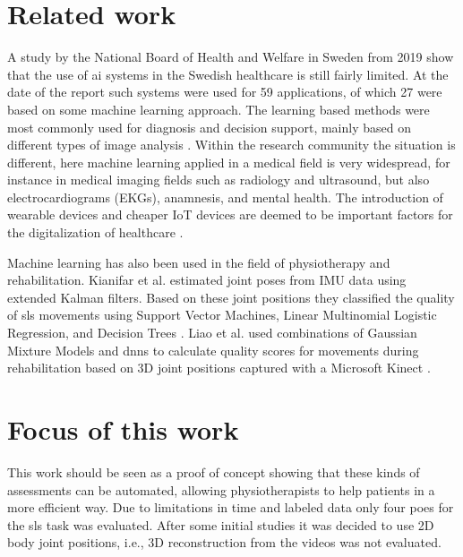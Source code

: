 \section{Related work}
A study by the National Board of Health and Welfare in Sweden from 2019 show that the use of \gls{ai} systems in the Swedish healthcare is still fairly limited. At the date of the report such systems were used for 59 applications, of which 27 were based on some machine learning approach. The learning based methods were most commonly used for diagnosis and decision support, mainly based on different types of image analysis \cite{soc2019}. Within the research community the situation is different, here machine learning applied in a medical field is very widespread, for instance in medical imaging fields such as radiology and ultrasound, but also electrocardiograms (EKGs), anamnesis, and mental health. The introduction of wearable devices and cheaper IoT devices are deemed to be important factors for the digitalization of healthcare \cite{Topol2019}.

Machine learning has also been used in the field of physiotherapy and rehabilitation. Kianifar et al. estimated joint poses from IMU data using extended Kalman filters. Based on these joint positions they classified the quality of \gls{sls} movements using Support Vector Machines, Linear Multinomial Logistic Regression, and Decision Trees \cite{Kianifar2016}. Liao et al. used combinations of Gaussian Mixture Models and \glspl{dnn} to calculate quality scores for movements during rehabilitation based on 3D joint positions captured with a Microsoft Kinect \cite{Liao2020}.


\section{Focus of this work}
This work should be seen as a proof of concept showing that these kinds of assessments can be automated, allowing physiotherapists to help patients in a more efficient way. Due to limitations in time and labeled data only four \glspl{poe} for the \gls{sls} task was evaluated. After some initial studies it was decided to use 2D body joint positions, i.e., 3D reconstruction from the videos was not evaluated.


